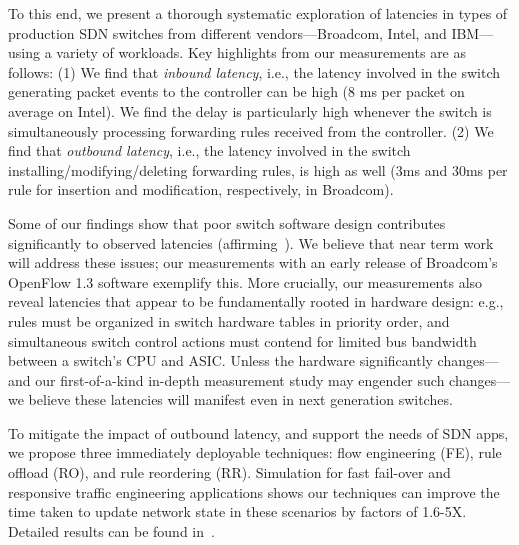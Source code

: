 To this end, we present a thorough systematic exploration of latencies in 
\numCombos types of production SDN switches from
\numVendors different vendors---Broadcom, Intel, and IBM---using a variety
of workloads. 
Key highlights from our measurements are as follows: (1) We
find that {\em inbound latency}, i.e., the latency involved in the
switch generating packet events to the controller can be high (8 ms per packet on average on Intel). We find the
delay is particularly high whenever the switch is simultaneously
processing forwarding rules received from the controller. (2) We find
that {\em outbound latency}, i.e., the latency involved in the switch
installing/modifying/deleting forwarding rules, is high as well (3ms and 30ms per rule for insertion and
modification, respectively, in Broadcom). 

Some of our findings show that poor switch software design
contributes significantly to observed latencies
(affirming~\cite{ucsdpaper,oflops}). We believe that near term work
will address these issues; our measurements with an early release of
Broadcom's OpenFlow 1.3 software exemplify this.
More crucially, our measurements also reveal latencies that appear to
be fundamentally rooted in hardware design: e.g., rules must be
organized in switch hardware tables in priority order, and
simultaneous switch control actions must contend for limited bus
bandwidth between a switch's CPU and ASIC. Unless the hardware
significantly changes---and our first-of-a-kind in-depth measurement
study may engender such changes---we believe these latencies will
manifest even in next generation switches.

To mitigate the impact of outbound latency, and support
the needs of SDN apps, we propose three
immediately deployable techniques: flow engineering (FE),
rule offload (RO), and rule reordering (RR).
Simulation for fast fail-over and responsive
 traffic engineering applications shows our techniques can
 improve the time taken to update network state in these scenarios by factors
 of 1.6-5X. Detailed results can be found in~\cite{mazu}.


